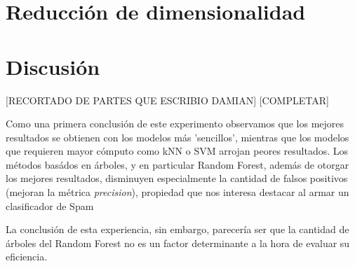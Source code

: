 \documentclass[10pt,a4paper]{article}
\begin{document}




 \section{Reducción de dimensionalidad}




 \section{Discusión}

[RECORTADO DE PARTES QUE ESCRIBIO DAMIAN]
[COMPLETAR]



Como una primera conclusión de este experimento observamos que los mejores resultados se obtienen con los modelos más 'sencillos', mientras que los modelos que requieren mayor cómputo como kNN o SVM arrojan peores resultados.
Los métodos basádos en árboles, y en particular Random Forest, además de otorgar los mejores resultados, disminuyen especialmente la cantidad de falsos positivos (mejoran la métrica \textit{precision}), propiedad que nos interesa destacar al armar un clasificador de Spam

La conclusión de esta experiencia, sin embargo, parecería ser que la cantidad de árboles del Random Forest no es un factor determinante a la hora de evaluar su eficiencia.

\end{document}
